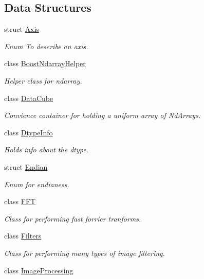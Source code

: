 \subsection*{Data Structures}
\begin{DoxyCompactItemize}
\item 
struct \mbox{\hyperlink{struct_num_cpp_1_1_axis}{Axis}}
\begin{DoxyCompactList}\small\item\em Enum To describe an axis. \end{DoxyCompactList}\item 
class \mbox{\hyperlink{class_num_cpp_1_1_boost_ndarray_helper}{Boost\+Ndarray\+Helper}}
\begin{DoxyCompactList}\small\item\em Helper class for ndarray. \end{DoxyCompactList}\item 
class \mbox{\hyperlink{class_num_cpp_1_1_data_cube}{Data\+Cube}}
\begin{DoxyCompactList}\small\item\em Convience container for holding a uniform array of Nd\+Arrays. \end{DoxyCompactList}\item 
class \mbox{\hyperlink{class_num_cpp_1_1_dtype_info}{Dtype\+Info}}
\begin{DoxyCompactList}\small\item\em Holds info about the dtype. \end{DoxyCompactList}\item 
struct \mbox{\hyperlink{struct_num_cpp_1_1_endian}{Endian}}
\begin{DoxyCompactList}\small\item\em Enum for endianess. \end{DoxyCompactList}\item 
class \mbox{\hyperlink{class_num_cpp_1_1_f_f_t}{F\+FT}}
\begin{DoxyCompactList}\small\item\em Class for performing fast forrier tranforms. \end{DoxyCompactList}\item 
class \mbox{\hyperlink{class_num_cpp_1_1_filters}{Filters}}
\begin{DoxyCompactList}\small\item\em Class for performing many types of image filtering. \end{DoxyCompactList}\item 
class \mbox{\hyperlink{class_num_cpp_1_1_image_processing}{Image\+Processing}}

\end{DoxyCompactItemize}

